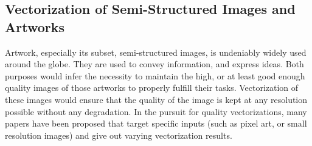 \subsection{Vectorization of Semi-Structured Images and Artworks}
Artwork, especially its subset, semi-structured images, is undeniably widely used around the globe. They are used to convey information, and express ideas. Both purposes would infer the necessity to maintain the high, or at least good enough quality images of those artworks to properly fulfill their tasks. Vectorization of these images would ensure that the quality of the image is kept at any resolution possible without any degradation. In the pursuit for quality vectorizations, many papers have been proposed that target specific inputs (such as pixel art, or small resolution images) and give out varying vectorization results.

